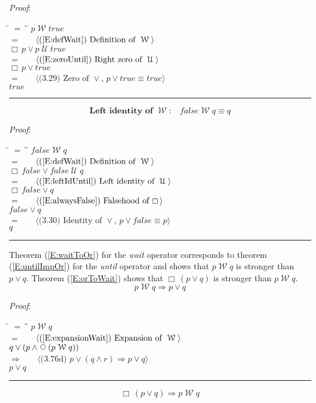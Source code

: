 \documentclass[12pt, fleqn, leqno]{article}
\newcommand{\lgap}{2pt}                             %
\newcommand{\mymathindent}{24pt}                    %
\newcommand{\impl}{\ensuremath{\Rightarrow}}        %
\newcommand{\Until}{\;\mathcal{U}\;}
\newcommand{\Wait}{\;\mathcal{W}\;}
\newcommand{\Next}{\;\,\text{\raisebox{3.5pt}{\circle{6}}}}
\newcommand{\Always}{\Box\,}
\newcommand{\myqed}{\rule[-.23ex]{1.2ex}{2.0ex}}
\newcommand{\myqedtab}{\hspace{384pt}}              %
\newcommand{\Gll} {\langle}                         %
\newcommand{\Ggg} {\rangle}                         %
\newcommand{\Hint}[1]     {\ \ \ $\Gll              \mbox{#1} \Ggg$ }   %
\begin{document}
\emph{Proof}:
\begin{tabbing}
\hspace{\mymathindent} \= $= \;$ \= \myqedtab \= \kill
\> \> $p \Wait true$\\[\lgap]
\> $=$ \> \Hint{(\ref{E:defWait}) Definition of $\Wait$} \\[\lgap]
\> \> $\Always p \lor p\Until true$\\[\lgap]
\> $=$ \> \Hint{(\ref{E:zeroUntil}) Right zero of $\Until$} \\[\lgap]
\> \> $\Always p \lor true$\\[\lgap]
\> $=$ \> \Hint{(3.29) Zero of $\lor$, $p\lor true\equiv true$}\\[\lgap]
\> \> $true$ \quad \myqed
\end{tabbing}
\begin{equation}\label{E:leftIdentWait}
\textbf{Left identity of $\Wait$:}\quad false \Wait q \equiv q
\end{equation}

\emph{Proof}:
\begin{tabbing}
\hspace{\mymathindent} \= $= \;$ \= \myqedtab \= \kill
\> \> $false \Wait q$\\[\lgap]
\> $=$ \> \Hint{(\ref{E:defWait}) Definition of $\Wait$} \\[\lgap]
\> \> $\Always false \lor false\Until q$\\[\lgap]
\> $=$ \> \Hint{(\ref{E:leftIdUntil}) Left identity of $\Until$}\\[\lgap]
\> \> $\Always false \lor q$\\[\lgap]
\> $=$ \> \Hint{(\ref{E:alwaysFalse}) Falsehood of $\Always$} \\[\lgap]
\> \> $false \lor q$\\[\lgap]
\> $=$ \> \Hint{(3.30) Identity of $\lor$, $p\lor false\equiv p$} \\[\lgap]
	\> \> $q$ \quad \myqed
\end{tabbing}

Theorem (\ref{E:waitToOr}) for the \textit{wait} operator corresponds to theorem (\ref{E:untilImpOr}) for the \textit{until} operator and shows that $p \Wait q$ is stronger than $p \lor q$.
Theorem (\ref{E:orToWait}) shows that $\Always(p \lor q)$ is stronger than $p \Wait q$.
\begin{equation}\label{E:waitToOr}
p \Wait q \impl p \lor q
\end{equation}

\emph{Proof}:
\begin{tabbing}
\hspace{\mymathindent} \= $= \;$ \= \myqedtab \= \kill
\> \> $p \Wait q$\\[\lgap]
\> $=$ \> \Hint{(\ref{E:expansionWait}) Expansion of $\Wait$} \\[\lgap]
\> \> $q \lor (p \land \Next(p \Wait q))$\\[\lgap]
\> $\impl$ \> \Hint{(3.76d) $p\lor (q\land r) \impl p\lor q$} \\[\lgap]
\> \> $p \lor q$ \quad \myqed
\end{tabbing}
\begin{equation}\label{E:orToWait}
\Always (p\lor q) \impl p \Wait q
\end{equation}
\end{document}
